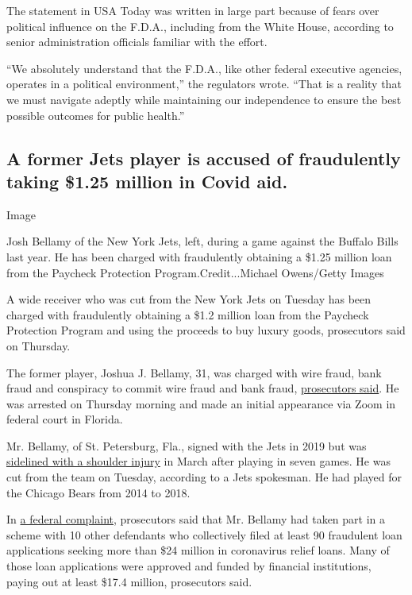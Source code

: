 The statement in USA Today was written in large part because of fears
over political influence on the F.D.A., including from the White House,
according to senior administration officials familiar with the effort.

``We absolutely understand that the F.D.A., like other federal executive
agencies, operates in a political environment,'' the regulators wrote.
``That is a reality that we must navigate adeptly while maintaining our
independence to ensure the best possible outcomes for public health.''

\hypertarget{a-former-jets-player-is-accused-of-fraudulently-taking-125-million-in-covid-aid}{%
\subsection{A former Jets player is accused of fraudulently taking
\$1.25 million in Covid
aid.}\label{a-former-jets-player-is-accused-of-fraudulently-taking-125-million-in-covid-aid}}

Image

Josh Bellamy of the New York Jets, left, during a game against the
Buffalo Bills last year. He has been charged with fraudulently obtaining
a \$1.25 million loan from the Paycheck Protection
Program.Credit...Michael Owens/Getty Images

A wide receiver who was cut from the New York Jets on Tuesday has been
charged with fraudulently obtaining a \$1.2 million loan from the
Paycheck Protection Program and using the proceeds to buy luxury goods,
prosecutors said on Thursday.

The former player, Joshua J. Bellamy, 31, was charged with wire fraud,
bank fraud and conspiracy to commit wire fraud and bank fraud,
\href{https://www.justice.gov/opa/pr/nfl-player-charged-role-24-million-covid-relief-fraud-scheme\#:~:text=Joshua\%20J.\%20Bellamy\%2C\%2031\%2C,wire\%20fraud\%20and\%20bank\%20fraud.}{prosecutors
said}. He was arrested on Thursday morning and made an initial
appearance via Zoom in federal court in Florida.

Mr. Bellamy, of St. Petersburg, Fla., signed with the Jets in 2019 but
was
\href{https://www.newyorkjets.com/news/jets-place-wrs-quincy-enunwa-josh-bellamy-on-reserve-pup}{sidelined
with a shoulder injury} in March after playing in seven games. He was
cut from the team on Tuesday, according to a Jets spokesman. He had
played for the Chicago Bears from 2014 to 2018.

In
\href{https://www.justice.gov/opa/press-release/file/1315621/download}{a
federal complaint}, prosecutors said that Mr. Bellamy had taken part in
a scheme with 10 other defendants who collectively filed at least 90
fraudulent loan applications seeking more than \$24 million in
coronavirus relief loans. Many of those loan applications were approved
and funded by financial institutions, paying out at least \$17.4
million, prosecutors said.

